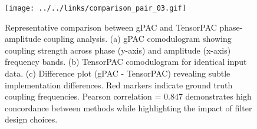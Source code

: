 \begin{figure}[htbp]
\centering
\texttt{[image: ../../links/comparison\_pair\_03.gif]}
\caption{Representative comparison between gPAC and TensorPAC phase-amplitude coupling analysis. 
(a) gPAC comodulogram showing coupling strength across phase (y-axis) and amplitude (x-axis) frequency bands. 
(b) TensorPAC comodulogram for identical input data. 
(c) Difference plot (gPAC - TensorPAC) revealing subtle implementation differences. 
Red markers indicate ground truth coupling frequencies. 
Pearson correlation = 0.847 demonstrates high concordance between methods while highlighting the impact of filter design choices.}
\label{fig:comparison_pairs}
\end{figure}
